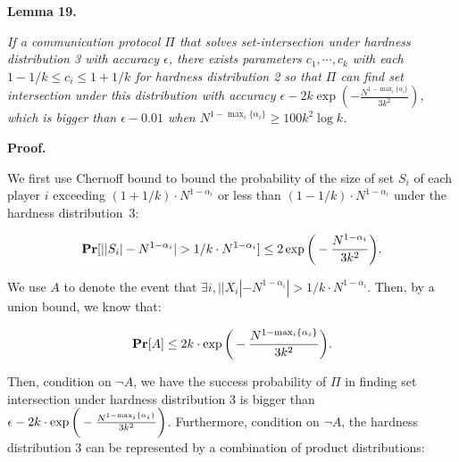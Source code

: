 \documentclass[10pt,a4paper]{article}
\begin{document}


\par\medskip\noindent\textbf{
\textbf{Lemma 19}\textbf{.}
}\par



\emph{If a communication protocol $\Pi$ that solves set-intersection under hardness distribution 3 with accuracy $\epsilon$, there exists parameters $c_{1},\cdots,c_{k}$ with each $1-1/k\leq c_{i}\leq 1+1/k$ for hardness distribution 2 so that $\Pi$ can find set intersection under this distribution with accuracy $\epsilon-2k\mathop{\exp}(-\frac{N^{1-\mathop{\max}_{i}\{\alpha_{i}\}}}{3k^{2}})$, which is bigger than $\epsilon-0.01$ when $N^{1-\mathop{\max}_{i}\{\alpha_{i}\}}\geq 100k^{2}\log k$.}\par






\par\medskip\noindent\textbf{Proof.}\par




We first use Chernoff bound to bound the probability of the size of set $S_{i}$ of each player $i$ exceeding $(1+1/k)\cdot N^{1-\alpha_{i}}$ or less than $(1-1/k)\cdot N^{1-\alpha_{i}}$ under the hardness distribution 3:\par


\[\begin{gathered}
\displaystyle\operatorname*{\mathbf{Pr}}[||S_{i}|-N^{1-\alpha_{i}}|>1/k\cdot N^{1-\alpha_{i}}]\leq 2\exp\bigg{(}-\frac{N^{1-\alpha_{i}}}{3k^{2}}\bigg{)}.
\end{gathered}\]


We use $A$ to denote the event that $\exists i,||X_{i}|-N^{1-\alpha_{i}}|>1/k\cdot N^{1-\alpha_{i}}$. Then, by a union bound, we know that:\par


\[\begin{gathered}
\operatorname*{\mathbf{Pr}}[A]\leq 2k\cdot\exp\bigg{(}-\frac{N^{1-\mathop{\max}_{i}\{\alpha_{i}\}}}{3k^{2}}\bigg{)}.
\end{gathered}\]


Then, condition on $\neg A$, we have the success probability of $\Pi$ in finding set intersection under hardness distribution 3 is bigger than $\epsilon-2k\cdot\exp\bigg{(}-\frac{N^{1-\mathop{\max}_{i}\{\alpha_{i}\}}}{3k^{2}}\bigg{)}$. Furthermore, condition on $\neg A$, the hardness distribution 3 can be represented by a combination of product distributions:\par
\end{document}
